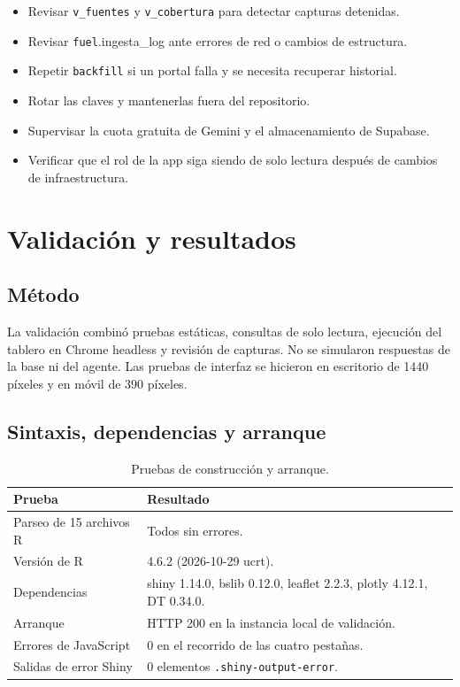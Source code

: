 \documentclass[12pt,a4paper]{article}
\newcommand{\fuel}{\texttt{fuel}}
\newcommand{\vista}[1]{\texttt{#1}}
\begin{document}
\begin{itemize}[leftmargin=1.2cm]
  \item Revisar \vista{v\_fuentes} y \vista{v\_cobertura} para detectar capturas detenidas.
  \item Revisar \fuel.ingesta\_log ante errores de red o cambios de estructura.
  \item Repetir \texttt{backfill} si un portal falla y se necesita recuperar historial.
  \item Rotar las claves y mantenerlas fuera del repositorio.
  \item Supervisar la cuota gratuita de Gemini y el almacenamiento de Supabase.
  \item Verificar que el rol de la app siga siendo de solo lectura después de cambios de infraestructura.
\end{itemize}

\section{Validación y resultados}\label{sec:validacion}

\subsection{Método}

La validación combinó pruebas estáticas, consultas de solo lectura, ejecución del tablero en Chrome headless y revisión de capturas. No se simularon respuestas de la base ni del agente. Las pruebas de interfaz se hicieron en escritorio de 1440 píxeles y en móvil de 390 píxeles.

\subsection{Sintaxis, dependencias y arranque}

\begin{table}[H]
\centering
\small
\caption{Pruebas de construcción y arranque.}
\label{tab:pruebas-build}
\begin{tabularx}{\linewidth}{@{}l X@{}}
\toprule
\textbf{Prueba} & \textbf{Resultado} \\
\midrule
Parseo de 15 archivos R & Todos sin errores. \\
Versión de R & 4.6.2 (2026-10-29 ucrt). \\
Dependencias & shiny 1.14.0, bslib 0.12.0, leaflet 2.2.3, plotly 4.12.1, DT 0.34.0. \\
Arranque & HTTP 200 en la instancia local de validación. \\
Errores de JavaScript & 0 en el recorrido de las cuatro pestañas. \\
Salidas de error Shiny & 0 elementos \texttt{.shiny-output-error}. \\
\bottomrule
\end{tabularx}
\end{table}
\end{document}
